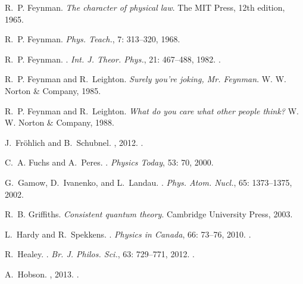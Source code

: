 \documentclass[12pt]{article}
\begin{document}
\begin{thebibliography}{63}
R.~P. Feynman.
\newblock \emph{{The character of physical law}}.
\newblock The MIT Press, 12th edition, 1965.

R.~P. Feynman.
\newblock \emph{Phys. Teach.}, 7: 313--320, 1968.

R.~P. Feynman.
.
\newblock \emph{Int. J. Theor. Phys.}, 21: 467--488, 1982.
.

R.~P. Feynman and R.~Leighton.
\newblock \emph{{Surely you're joking, Mr. Feynman}}.
\newblock W. W. Norton \& Company, 1985.

R.~P. Feynman and R.~Leighton.
\newblock \emph{{What do you care what other people think?}}
\newblock W. W. Norton \& Company, 1988.

J.~Fr\"{o}hlich and B.~Schubnel.
, 2012.
.

C.~A. Fuchs and A.~Peres.
.
\newblock \emph{Physics Today}, 53: 70, 2000.

G.~Gamow, D.~Ivanenko, and L.~Landau.
.
\newblock \emph{Phys. Atom. Nucl.}, 65: 1373--1375, 2002.

R.~B. Griffiths.
\newblock \emph{{Consistent quantum theory}}.
\newblock Cambridge University Press, 2003.

L.~Hardy and R.~Spekkens.
.
\newblock \emph{Physics in Canada}, 66: 73--76, 2010.
.

R.~Healey.
.
\newblock \emph{Br. J. Philos. Sci.}, 63: 729--771, 2012.
.

A.~Hobson.
, 2013.
.


\end{thebibliography}
\end{document}
